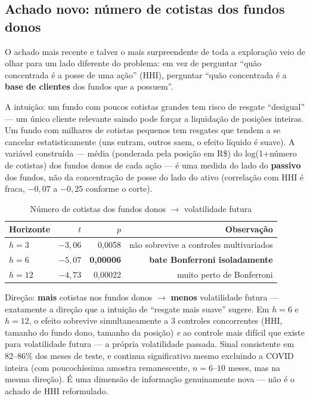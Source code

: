 \documentclass[11pt,a4paper]{article}
\begin{document}
\subsection{Achado novo: número de cotistas dos fundos donos}
\label{sec:cotistas}

O achado mais recente e talvez o mais surpreendente de toda a exploração
veio de olhar para um lado diferente do problema: em vez de perguntar
``quão concentrada é a posse de uma ação'' (HHI), perguntar ``quão
concentrada é a \textbf{base de clientes} dos fundos que a possuem''.

A intuição: um fundo com poucos cotistas grandes tem risco de resgate
``desigual'' --- um único cliente relevante saindo pode forçar a
liquidação de posições inteiras. Um fundo com milhares de cotistas
pequenos tem resgates que tendem a se cancelar estatisticamente (uns
entram, outros saem, o efeito líquido é suave). A variável construída ---
média (ponderada pela posição em R\$) do log(1+número de cotistas) dos
fundos donos de cada ação --- é uma medida do lado do \textbf{passivo} dos
fundos, não da concentração de posse do lado do ativo (correlação com HHI
é fraca, $-0{,}07$ a $-0{,}25$ conforme o corte).

\begin{table}[H]\centering\small
\caption{Número de cotistas dos fundos donos $\to$ volatilidade futura}
\begin{tabular}{@{}lrrr@{}}
\toprule
Horizonte & $t$ & $p$ & Observação \\
\midrule
$h=3$  & $-3{,}06$ & 0,0058 & não sobrevive a controles multivariados \\
$h=6$  & $-5{,}07$ & \textbf{0,00006} & \textbf{bate Bonferroni isoladamente} \\
$h=12$ & $-4{,}73$ & 0,00022 & muito perto de Bonferroni \\
\bottomrule
\end{tabular}
\end{table}

Direção: \textbf{mais} cotistas nos fundos donos $\to$ \textbf{menos}
volatilidade futura --- exatamente a direção que a intuição de
``resgate mais suave'' sugere. Em $h=6$ e $h=12$, o efeito sobrevive
simultaneamente a 3 controles concorrentes (HHI, tamanho do fundo dono,
tamanho da posição) \emph{e} ao controle mais difícil que existe para
volatilidade futura --- a própria volatilidade passada. Sinal consistente
em 82--86\% dos meses de teste, e continua significativo mesmo excluindo a
COVID inteira (com poucochíssima amostra remanescente, $n=6$--$10$ meses,
mas na mesma direção). É uma dimensão de informação genuinamente nova ---
não é o achado de HHI reformulado.
\end{document}
